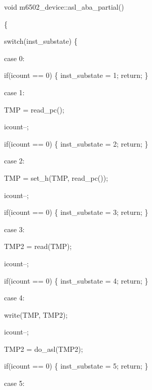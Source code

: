 \documentclass[letterpaper,10pt,brazil]{sphinxmanual}
\begin{document}
\begin{DUlineblock}{0em}
\item[] void m6502\_device::asl\_aba\_partial()
\item[] \{
\item[] switch(inst\_substate) \{
\item[] case 0:
\item[]
\begin{DUlineblock}{\DUlineblockindent}
\item[] if(icount == 0) \{ inst\_substate = 1; return; \}
\end{DUlineblock}
\item[] case 1:
\item[]
\begin{DUlineblock}{\DUlineblockindent}
\item[] TMP = read\_pc();
\item[] icount--;
\item[] if(icount == 0) \{ inst\_substate = 2; return; \}
\end{DUlineblock}
\item[] case 2:
\item[]
\begin{DUlineblock}{\DUlineblockindent}
\item[] TMP = set\_h(TMP, read\_pc());
\item[] icount--;
\item[] if(icount == 0) \{ inst\_substate = 3; return; \}
\end{DUlineblock}
\item[] case 3:
\item[]
\begin{DUlineblock}{\DUlineblockindent}
\item[] TMP2 = read(TMP);
\item[] icount--;
\item[] if(icount == 0) \{ inst\_substate = 4; return; \}
\end{DUlineblock}
\item[] case 4:
\item[]
\begin{DUlineblock}{\DUlineblockindent}
\item[] write(TMP, TMP2);
\item[] icount--;
\item[] TMP2 = do\_asl(TMP2);
\item[] if(icount == 0) \{ inst\_substate = 5; return; \}
\end{DUlineblock}
\item[] case 5:

\end{DUlineblock}
\end{document}
